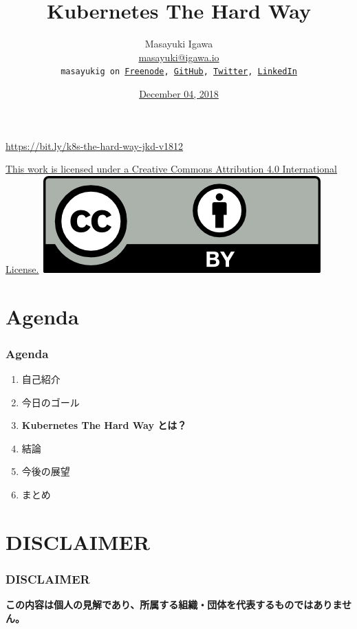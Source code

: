 \documentclass[aspectratio=169,11pt,hyperref={colorlinks=true}]{beamer}
\author[Masayuki Igawa]{%
    \texorpdfstring{%
            \centering
            Masayuki Igawa\\
            \href{mailto:masayuki@igawa.io}{masayuki@igawa.io}\\
            \texttt{masayukig on
              \href{https://freenode.net/}{Freenode},
              \href{https://github.com/masayukig}{GitHub},
              \href{https://twitter.com/masayukig}{Twitter},
              \href{https://www.linkedin.com/in/masayukig/}{LinkedIn}}
    }
    {Masayuki Igawa}
}
\date{\href{https://containerdays.jp/timetable.html}{December 04, 2018}}
\title[k8s-the-hard-way
  \hspace{4em}\insertframenumber/\inserttotalframenumber]{\Huge{Kubernetes The Hard Way}}
\begin{document}
{%
\begin{frame}[noframenumbering]
  \hypersetup{colorlinks,urlcolor=suse}
  \titlepage{}
  \centering
  \@place \par
  \href{https://bit.ly/k8s-the-hard-way-jkd-v1812}{https://bit.ly/k8s-the-hard-way-jkd-v1812}
  \begin{flushright}
    \tiny\href{https://creativecommons.org/licenses/by/4.0/}{This work
      is licensed under a Creative Commons Attribution 4.0
      International License.}~\includegraphics[scale=0.3]{images/cc_by.png}
  \end{flushright}
\end{frame}
}

\section{Agenda}
\begin{frame}
  \frametitle{Agenda}
  \begin{enumerate}
    \item 自己紹介
    \item 今日のゴール
    \item \bf{Kubernetes The Hard Way} とは？
    \item 結論
    \item 今後の展望
    \item まとめ
  \end{enumerate}
\end{frame}

\section{DISCLAIMER}
\begin{frame}
  \frametitle{DISCLAIMER}
  \Huge{\bf{この内容は個人の見解であり、所属する組織・団体を代表するものではありません。}}
\end{frame}
\end{document}
